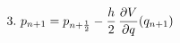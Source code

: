 \documentclass[preview]{standalone}
\begin{document}
\begin{align*}
\special{dvisvgm:raw <g id='unique000'>}3.\ p_{n+1} = p_{n+\frac{1}{2}} - \frac{h}{2}\,\frac{\partial V}{\partial q}(q_{n+1})\special{dvisvgm:raw </g>}
\end{align*}
\end{document}
